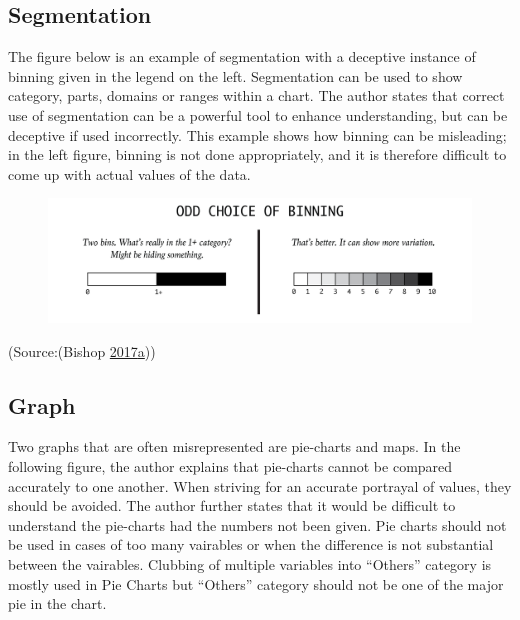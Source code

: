 \documentclass[]{book}
\theoremstyle{definition}
\theoremstyle{definition}
\theoremstyle{definition}
\theoremstyle{remark}
\begin{document}
\subsection{Segmentation}\label{segmentation}

The figure below is an example of segmentation with a deceptive instance
of binning given in the legend on the left. Segmentation can be used to
show category, parts, domains or ranges within a chart. The author
states that correct use of segmentation can be a powerful tool to
enhance understanding, but can be deceptive if used incorrectly. This
example shows how binning can be misleading; in the left figure, binning
is not done appropriately, and it is therefore difficult to come up with
actual values of the data.

\begin{figure}
\centering
\includegraphics{images/Segmentation1.png}
\caption{}
\end{figure}

(Source:(Bishop
\protect\hyperlink{ref-visual-lies}{2017}\protect\hyperlink{ref-visual-lies}{a}))

\subsection{Graph}\label{graph}

Two graphs that are often misrepresented are pie-charts and maps. In the
following figure, the author explains that pie-charts cannot be compared
accurately to one another. When striving for an accurate portrayal of
values, they should be avoided. The author further states that it would
be difficult to understand the pie-charts had the numbers not been
given. Pie charts should not be used in cases of too many vairables or
when the difference is not substantial between the vairables. Clubbing
of multiple variables into ``Others'' category is mostly used in Pie
Charts but ``Others'' category should not be one of the major pie in the
chart.
\end{document}
